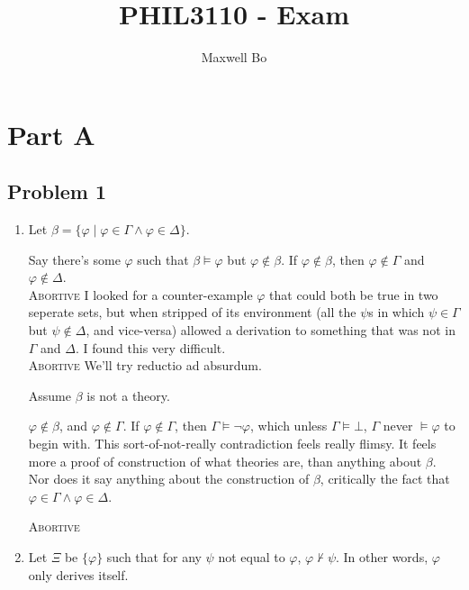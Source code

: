 \documentclass[a4paper]{article}
\title{PHIL3110 - Exam}
\author{Maxwell Bo}
\newcommand{\SET}[1]{\{ {#1} \}}
\begin{document}
 

\maketitle

\section*{Part A}

\subsection*{Problem 1}

\begin{enumerate}

    \item

Let $\beta = \SET{ \varphi \mid \varphi \in \Gamma \wedge \varphi \in \Delta }$.

Say there's some $\varphi$ such that $\beta \models \varphi$ but $\varphi \not\in \beta$. If $\varphi \not\in \beta$, then $\varphi \not\in \Gamma$ and $\varphi \not\in \Delta$.\\

    \textsc{Abortive} I looked for a counter-example $\varphi$ that could both be true in two seperate sets, but when stripped of its environment (all the $\psi$s in which $\psi \in \Gamma$ but $\psi \not\in \Delta$, and vice-versa) allowed a derivation to something that was not in $\Gamma$ and $\Delta$. I found this very difficult.\\

    \textsc{Abortive} We'll try reductio ad absurdum. 

    Assume $\beta$ is not a theory. 
    
    $\varphi \not\in \beta$, and $\varphi \not\in \Gamma$. If $\varphi \not \in \Gamma$, then $\Gamma \models \neg \varphi$, which unless $\Gamma \models \bot$, $\Gamma$ never $\models \varphi$ to begin with. This sort-of-not-really contradiction feels really flimsy. It feels more a proof of construction of what theories are, than anything about $\beta$. Nor does it say anything about the construction of $\beta$, critically the fact that $\varphi \in \Gamma \wedge \varphi \in \Delta$.


    \textsc{Abortive}

    \item Let $\Xi$ be $\SET{\varphi}$ such that for any $\psi$ not equal to $\varphi$, $\varphi \not\vdash \psi$. In other words, $\varphi$ only derives itself.


\end{enumerate}
\end{document}
